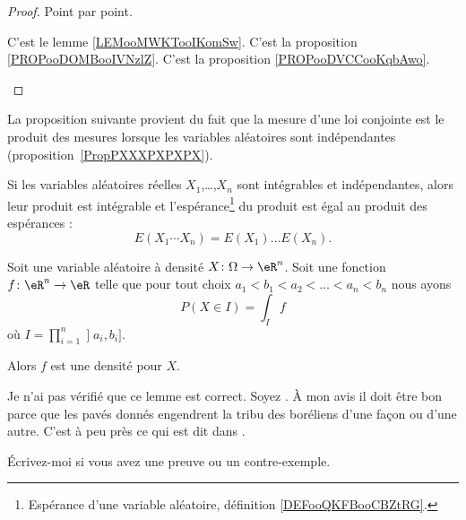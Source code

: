 \begin{proof}
	Point par point.
	\begin{subproof}
		C'est le lemme \ref{LEMooMWKTooIKomSw}.
		C'est la proposition \ref{PROPooDOMBooIVNzlZ}.
		C'est la proposition \ref{PROPooDVCCooKqbAwo}.
	\end{subproof}
\end{proof}


La proposition suivante provient du fait que la mesure d'une loi conjointe est le produit des mesures lorsque les variables aléatoires sont indépendantes (proposition~\ref{PropPXXXPXPXPX}).
\begin{proposition}           \label{PROPooDKQDooREiSSf}
	Si les variables aléatoires réelles \( X_1\),\ldots,\( X_n\) sont intégrables et indépendantes, alors leur produit est intégrable et l'espérance\footnote{Espérance d'une variable aléatoire, définition \ref{DEFooQKFBooCBZtRG}.} du produit est égal au produit des espérances :
	\begin{equation}
		E(X_1\cdots X_n)=E(X_1)\ldots E(X_n).
	\end{equation}
\end{proposition}

\begin{lemma}       \label{LEMooIVIWooUUVStW}
	Soit une variable aléatoire à densité \( X\colon \Omega\to \eR^n\). Soit une fonction \( f\colon \eR^n\to \eR\) telle que pour tout choix \( a_1<b_1<a_2<\ldots <a_n<b_n\) nous ayons
	\begin{equation}
		P(X\in I)=\int_I f
	\end{equation}
	où \( I=\prod_{i=1}^n\mathopen] a_i , b_i \mathclose]\).

	Alors \( f\) est une densité pour \( X\).

	\begin{probleme}		\label{PROBooAHJSooWUuJhb}
		Je n'ai pas vérifié que ce lemme est correct. Soyez . À mon avis il doit être bon parce que les pavés donnés engendrent la tribu des boréliens d'une façon ou d'une autre. C'est à peu près ce qui est dit dans \cite{BIBooMECWooHQJweh}.

		Écrivez-moi si vous avez une preuve ou un contre-exemple.
	\end{probleme}
\end{lemma}


